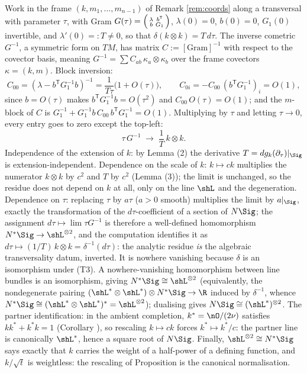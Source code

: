 Work in the frame $(k, m_1, \dots, m_{n-1})$ of Remark \ref{rem:coords} along a transversal with parameter $\tau$, with Gram $G(\tau) = \begin{psmallmatrix} \lambda & b^{\mathsf T} \\ b & G_1 \end{psmallmatrix}$, $\lambda(0) = 0$, $b(0) = 0$, $G_1(0)$ invertible, and $\lambda'(0) =: T \neq 0$, so that $\delta(k \otimes k) = T\, d\tau$. The inverse cometric $G^{-1}$, a symmetric form on $TM$, has matrix $C := [\text{Gram}]^{-1}$ with respect to the covector basis, meaning $G^{-1} = \sum C_{ab}\, \kappa_a \otimes \kappa_b$ over the frame covectors $\kappa = (k, m)$. Block inversion:
\[
C_{00} = (\lambda - b^{\mathsf T} G_1^{-1} b)^{-1} = \frac{1}{T\tau}\bigl(1 + O(\tau)\bigr), \qquad
C_{0i} = -C_{00}\, (b^{\mathsf T} G_1^{-1})_i = O(1),
\]
since $b = O(\tau)$ makes $b^{\mathsf T} G_1^{-1} b = O(\tau^2)$ and $C_{00}\,O(\tau) = O(1)$; and the $m$-block of $C$ is $G_1^{-1} + G_1^{-1} b\, C_{00}\, b^{\mathsf T} G_1^{-1} = O(1)$. Multiplying by $\tau$ and letting $\tau \to 0$, every entry goes to zero except the top-left:
\[
\tau\, G^{-1} \;\longrightarrow\; \frac{1}{T}\, k \otimes k .
\]
Independence of the extension of $k$: by Lemma (2) the derivative $T = dg_k(\partial_\tau)|_\Sig$ is extension-independent. Dependence on the scale of $k$: $k \mapsto ck$ multiplies the numerator $k \otimes k$ by $c^2$ and $T$ by $c^2$ (Lemma (3)); the limit is unchanged, so the residue does not depend on $k$ at all, only on the line $\shL$ and the degeneration. Dependence on $\tau$: replacing $\tau$ by $a\tau$ ($a > 0$ smooth) multiplies the limit by $a|_\Sig$, exactly the transformation of the $d\tau$-coefficient of a section of $N\Sig$; the assignment $d\tau \mapsto \lim \tau G^{-1}$ is therefore a well-defined homomorphism $N^*\Sig \to \shL^{\otimes 2}$, and the computation identifies it as $d\tau \mapsto (1/T)\,k \otimes k = \delta^{-1}(d\tau)$: the analytic residue \emph{is} the algebraic transversality datum, inverted. It is nowhere vanishing because $\delta$ is an isomorphism under (T3). A nowhere-vanishing homomorphism between line bundles is an isomorphism, giving $N^*\Sig \cong \shL^{\otimes 2}$ (equivalently, the nondegenerate pairing $(\shL^* \otimes \shL^*) \otimes N^*\Sig \to \R$ induced by $\delta^{-1}$, whence $N^*\Sig \cong (\shL^* \otimes \shL^*)^* = \shL^{\otimes 2}$); dualising gives $N\Sig \cong (\shL^*)^{\otimes 2}$. The partner identification: in the ambient completion, $k^* = \nO/(2\nu)$ satisfies $kk^* + k^*k = 1$ (Corollary ), so rescaling $k \mapsto ck$ forces $k^* \mapsto k^*/c$: the partner line is canonically $\shL^*$, hence a square root of $N\Sig$. Finally, $\shL^{\otimes 2} \cong N^*\Sig$ says exactly that $k$ carries the weight of a half-power of a defining function, and $k/\sqrt t$ is weightless: the rescaling of Proposition  is the canonical normalisation.
